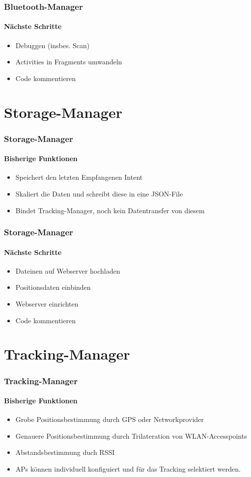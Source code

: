 \documentclass{beamer}
\begin{document}
\begin{frame}
\frametitle{Bluetooth-Manager}
\framesubtitle{N\"achste Schritte}
\begin{itemize}
  \item Debuggen (insbes. Scan)
  \item Activities in Fragments umwandeln
  \item Code kommentieren
\end{itemize}
\end{frame}


\section{Storage-Manager}



\begin{frame}
\frametitle{Storage-Manager}
\framesubtitle{Bisherige Funktionen}
\begin{itemize}
  \item Speichert den letzten Empfangenen Intent
  \item Skaliert die Daten und schreibt diese in eine JSON-File
  \item Bindet Tracking-Manager, noch kein Datentransfer von diesem
\end{itemize}
\end{frame}

\begin{frame}
\frametitle{Storage-Manager}
\framesubtitle{N\"achste Schritte}
\begin{itemize}
  \item Dateinen auf Webserver hochladen
  \item Positionsdaten einbinden
  \item Webserver einrichten
  \item Code kommentieren

\end{itemize}
\end{frame}

\section{Tracking-Manager}

\begin{frame}
\frametitle{Tracking-Manager}
\framesubtitle{Bisherige Funktionen}
\begin{itemize}
  \item Grobe Positionsbestimmung durch GPS oder Networkprovider
  \item	Genauere Positionsbestimmung durch Trilateration von WLAN-Accesspoints
  \item	Abstandsbestimmung duch RSSI
  \item	APs k\"onnen individuell konfiguiert und f\"ur das Tracking selektiert werden.
\end{itemize}
\end{frame}
\end{document}

